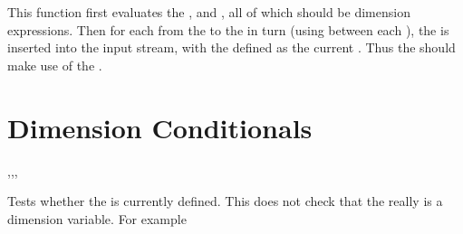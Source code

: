 \documentclass[oneside]{book}
\begin{document}
\begin{function}{\DimStepVariable}
\begin{syntax}
     
\end{syntax}
This function first evaluates the , 
and , all of which should be dimension expressions.
Then for each  from the  to the
 in turn (using  between each
), the  is inserted into the input stream,
with the  defined as the current .  Thus
the  should make use of the .
\end{function}

\section{Dimension Conditionals}

\begin{function}{\DimIfExist,\DimIfExistT,\DimIfExistF,\DimIfExistTF}
\begin{syntax}
 
  
  
   
\end{syntax}
Tests whether the  is currently defined.  This does
not check that the  really is a dimension variable.
For example
\begin{demohigh}
\DimIfExistTF {} {}
\DimIfExistTF {} {}
\end{demohigh}
\end{function}
\end{document}
